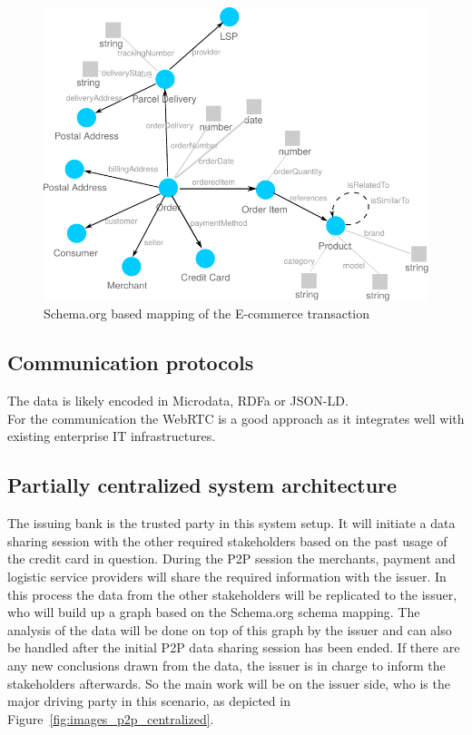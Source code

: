\begin{figure}[H]
	\centering
		\includegraphics[width=0.8\columnwidth]{images/schema_org_mapping.pdf}
	\caption{Schema.org based mapping of the \gls{E-commerce} transaction}
\label{fig:images_schema_org}
\end{figure}


\subsection{Communication protocols}
\label{subsec:comm_protocol}

 The data is likely encoded in Microdata, \gls{RDFa} or \gls{JSON-LD}. \\

For the communication the \gls{WebRTC} is a good approach as it integrates well with existing enterprise IT infrastructures.


\subsection{Partially centralized system architecture}
\label{subsec:p2p_partially_centralized_system}

The issuing bank is the trusted party in this system setup. It will initiate a data sharing session with the other required stakeholders based on the past usage of the credit card in question. During the P2P session the merchants, payment and logistic service providers will share the required information with the issuer. In this process the data from the other stakeholders will be replicated to the issuer, who will build up a graph based on the Schema.org schema mapping. The analysis of the data will be done on top of this graph by the issuer and can also be handled after the initial P2P data sharing session has been ended. If there are any new conclusions drawn from the data, the issuer is in charge to inform the stakeholders afterwards. So the main work will be on the issuer side, who is the major driving party in this scenario, as depicted in Figure~\ref{fig:images_p2p_centralized}.\@

